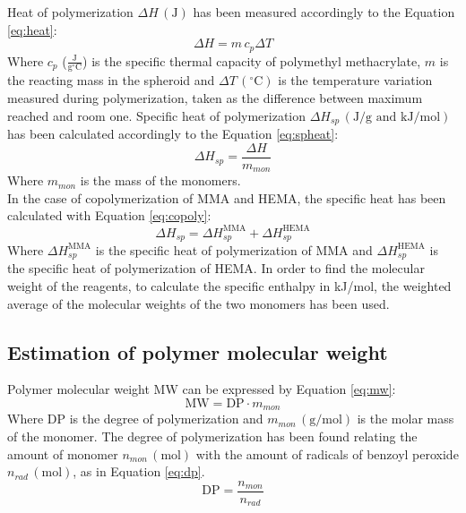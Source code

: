 \documentclass[a4paper, 11pt]{article}
\begin{document}
Heat of polymerization $\Delta H \,(\text{J})$ has been measured accordingly to the Equation \ref{eq:heat}:
\begin{equation}
\Delta H = m \,c_p \Delta T
\label{eq:heat} 
\end{equation}
Where $c_p$ ($\frac{\text{J}}{\text{g}^\circ\text{C}}$) is the specific thermal capacity of polymethyl methacrylate, $m$ is the reacting mass in the spheroid and $\Delta T\,(^\circ\text{C})$ is the temperature variation measured during polymerization, taken as the difference between maximum reached and room one. Specific heat of polymerization $\Delta H_{sp}\,(\text{J}/\text{g} \,\, \text{and} \,\, \text{kJ}/\text{mol})$ has been calculated accordingly to the Equation \ref{eq:spheat}:
\begin{equation}
\Delta H_{sp} = \frac{\Delta H}{m_{mon}}
\label{eq:spheat} 
\end{equation}
Where $m_{mon}$ is the mass of the monomers. \\
In the case of copolymerization of MMA and HEMA, the specific heat has been calculated with Equation \ref{eq:copoly}:
\begin{equation}
\Delta H_{sp} = \Delta H_{sp}^\text{MMA} + \Delta H_{sp}^\text{HEMA}
\label{eq:copoly} 
\end{equation}
Where $\Delta H_{sp}^\text{MMA}$ is the specific heat of polymerization of MMA and $\Delta H_{sp}^\text{HEMA}$ is the specific heat of polymerization of HEMA. In order to find the molecular weight of the reagents, to calculate the specific enthalpy in kJ/mol, the weighted average of the molecular weights of the two monomers has been used. 

\subsection{Estimation of polymer molecular weight}

Polymer molecular weight MW can be expressed by Equation \ref{eq:mw}:
\begin{equation}
\text{MW} = \text{DP}\cdot m_{mon}
\label{eq:mw} 
\end{equation}
Where DP is the degree of polymerization and $m_{mon}\,(\text{g}/\text{mol})$ is the molar mass of the monomer. The degree of polymerization has been found relating the amount of monomer $n_{mon}\,(\text{mol})$ with the amount of radicals of benzoyl peroxide $n_{rad}\,(\text{mol})$, as in Equation \ref{eq:dp}.
\begin{equation}
\text{DP} = \frac{n_{mon}}{n_{rad}}
\label{eq:dp} 
\end{equation}
\end{document}
